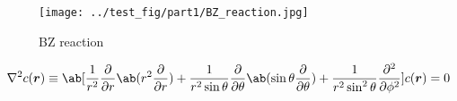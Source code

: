 \documentclass[autodetect-engine,dvipdfmx-if-dvi,a4paper,ja=standard]{bxjsarticle}
\begin{document}
\begin{figure}
  \centering
  \texttt{[image: ../test\_fig/part1/BZ\_reaction.jpg]}
  \caption{BZ reaction}
  \label{fig:BZ}
\end{figure}

\begin{equation}
  \nabla^2c(\bm{r})\equiv \ab[\frac{1}{r^2}\pdv*{\ab(r^2\pdv{}{r})}{r}+\frac{1}{r^2\sin\theta}\pdv*{\ab(\sin\theta\pdv{}{\theta})}{\theta}+\frac{1}{r^2\sin^2\theta}\pdv[2]{}{\phi}]c(\bm{r})=0
  \label{eq:laplace}
\end{equation}
%   
%   
\end{document}
